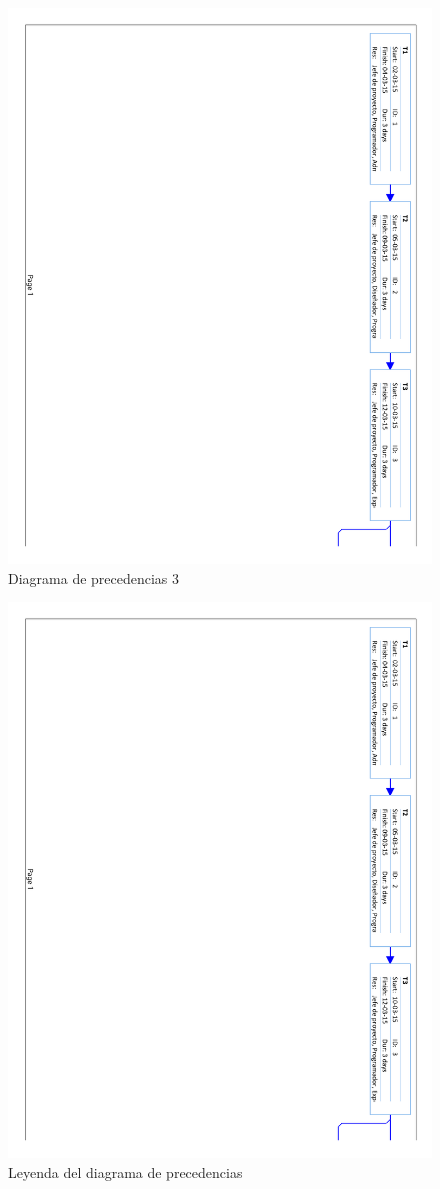 \begin{figure}[!htbp]
	\centering
	\includegraphics[page=3, scale=.65]{fig/network_diagram}
	\caption{Diagrama de precedencias 3}
\end{figure}

\begin{figure}[!htbp]
	\centering
	\includegraphics[page=4, scale=.65]{fig/network_diagram}
	\caption{Leyenda del diagrama de precedencias}
\end{figure}